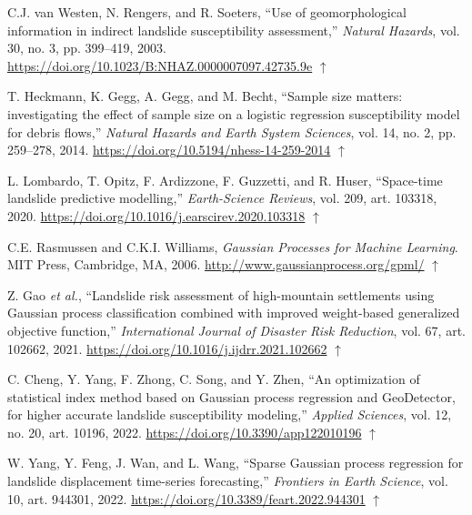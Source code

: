 \documentclass[letterpaper,11pt]{tec}
\begin{document}
{\begin{thebibliography}{}
 C.J. van Westen, N. Rengers, and R. Soeters, ``Use of geomorphological information in indirect landslide susceptibility assessment,'' {\it Natural Hazards}, vol. 30, no. 3, pp. 399--419, 2003.
\url{https://doi.org/10.1023/B:NHAZ.0000007097.42735.9e}
$\uparrow$\par

 T. Heckmann, K. Gegg, A. Gegg, and M. Becht, ``Sample size matters: investigating the effect of sample size on a logistic regression susceptibility model for debris flows,'' {\it Natural Hazards and Earth System Sciences}, vol. 14, no. 2, pp. 259--278, 2014.
\url{https://doi.org/10.5194/nhess-14-259-2014}
$\uparrow$\par

 L. Lombardo, T. Opitz, F. Ardizzone, F. Guzzetti, and R. Huser, ``Space-time landslide predictive modelling,'' {\it Earth-Science Reviews}, vol. 209, art. 103318, 2020.
\url{https://doi.org/10.1016/j.earscirev.2020.103318}
$\uparrow$\par

 C.E. Rasmussen and C.K.I. Williams, {\it Gaussian Processes for Machine Learning}. MIT Press, Cambridge, MA, 2006.
\url{http://www.gaussianprocess.org/gpml/}
$\uparrow$\par

 Z. Gao {\it et al.}, ``Landslide risk assessment of high-mountain settlements using Gaussian process classification combined with improved weight-based generalized objective function,'' {\it International Journal of Disaster Risk Reduction}, vol. 67, art. 102662, 2021.
\url{https://doi.org/10.1016/j.ijdrr.2021.102662}
$\uparrow$\par

 C. Cheng, Y. Yang, F. Zhong, C. Song, and Y. Zhen, ``An optimization of statistical index method based on Gaussian process regression and GeoDetector, for higher accurate landslide susceptibility modeling,'' {\it Applied Sciences}, vol. 12, no. 20, art. 10196, 2022.
\url{https://doi.org/10.3390/app122010196}
$\uparrow$\par

 W. Yang, Y. Feng, J. Wan, and L. Wang, ``Sparse Gaussian process regression for landslide displacement time-series forecasting,'' {\it Frontiers in Earth Science}, vol. 10, art. 944301, 2022.
\url{https://doi.org/10.3389/feart.2022.944301}
$\uparrow$\par


\end{thebibliography}}
\end{document}
